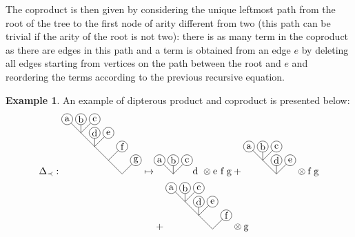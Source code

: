 \documentclass[11pt,leqno]{amsart}
\theoremstyle{definition}
\newtheorem{example}[definition]{Example}
\theoremstyle{plain}
\begin{document}
The coproduct is then given by considering the unique leftmost path from the root of the tree to the first node of arity different from two (this path can be trivial if the arity of the root is not two): there is as many term in the coproduct as there are edges in this path and a term is obtained from an edge $e$ by deleting all edges starting from vertices on the path between the root and $e$ and reordering the terms according to the previous recursive equation.

\begin{example}
An example of dipterous product and coproduct is presented below:
\begin{align*}
\Delta_{\prec}:
\begin{tikzpicture}[scale=0.5]
\draw (-2,2)--(0,0)--(1,1);
\draw (-1,1)--(0,2);
\draw (-1,3)--(-2,2)--(-3,3);
\draw (-2,2)--(-2,3);
\draw (-2,4)--(-3,3)--(-4,4);
\draw (-3,3)--(-3,4);
\draw[black, fill=white] (1,1) circle (0.4);
\draw[black, fill=white] (0,2) circle (0.4);
\draw[black, fill=white] (-2,3) circle (0.4);
\draw[black, fill=white] (-1,3) circle (0.4);
\draw[black, fill=white] (-2,4) circle (0.4);
\draw[black, fill=white] (-3,4) circle (0.4);
\draw[black, fill=white] (-4,4) circle (0.4);
\draw(1,1) node{g};
\draw(0,2) node{f};
\draw(-2,3) node{d};
\draw(-1,3) node{e};
\draw(-2,4) node{c};
\draw(-3,4) node{b};
\draw(-4,4) node{a};
\end{tikzpicture}
\mapsto &
\begin{tikzpicture}[scale=0.5]
\draw (-2,4)--(-3,3)--(-4,4);
\draw (-3,3)--(-3,4);
\draw[black, fill=white] (-2,4) circle (0.4);
\draw[black, fill=white] (-3,4) circle (0.4);
\draw[black, fill=white] (-4,4) circle (0.4);
\draw(-2,4) node{c};
\draw(-3,4) node{b};
\draw(-4,4) node{a};
\end{tikzpicture}
\text{d }
\otimes
\text{e f g}
 +
\begin{tikzpicture}[scale=0.5]
\draw (-1,3)--(-2,2)--(-3,3);
\draw (-2,2)--(-2,3);
\draw (-2,4)--(-3,3)--(-4,4);
\draw (-3,3)--(-3,4);
\draw[black, fill=white] (-2,3) circle (0.4);
\draw[black, fill=white] (-1,3) circle (0.4);
\draw[black, fill=white] (-2,4) circle (0.4);
\draw[black, fill=white] (-3,4) circle (0.4);
\draw[black, fill=white] (-4,4) circle (0.4);
\draw(-2,3) node{d};
\draw(-1,3) node{e};
\draw(-2,4) node{c};
\draw(-3,4) node{b};
\draw(-4,4) node{a};
\end{tikzpicture}
\otimes
\text{f g}\\
&
+
\begin{tikzpicture}[scale=0.5]
\draw (-2,2)--(-1,1);
\draw (-1,1)--(0,2);
\draw (-1,3)--(-2,2)--(-3,3);
\draw (-2,2)--(-2,3);
\draw (-2,4)--(-3,3)--(-4,4);
\draw (-3,3)--(-3,4);
\draw[black, fill=white] (0,2) circle (0.4);
\draw[black, fill=white] (-2,3) circle (0.4);
\draw[black, fill=white] (-1,3) circle (0.4);
\draw[black, fill=white] (-2,4) circle (0.4);
\draw[black, fill=white] (-3,4) circle (0.4);
\draw[black, fill=white] (-4,4) circle (0.4);
\draw(0,2) node{f};
\draw(-2,3) node{d};
\draw(-1,3) node{e};
\draw(-2,4) node{c};
\draw(-3,4) node{b};
\draw(-4,4) node{a};
\end{tikzpicture}
\otimes
\text{g}
\end{align*}


\end{example}
\end{document}
